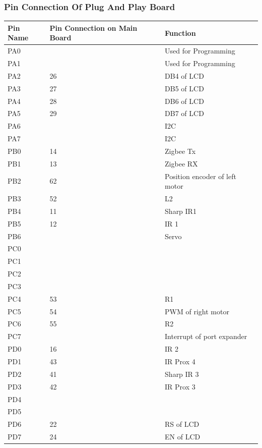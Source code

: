 \documentclass[a4paper,12pt,oneside]{article}
\begin{document}
{\begin{longtable}{|p{}|p{}|p{}|p{}|p{}|}
		\end{longtable}
	\subsubsection{Pin Connection Of Plug And Play Board}
		\begin{longtable}{|p{}|p{}|p{}|}\hline
			Pin Name&	Pin Connection on Main Board&	Function \\ \hline
			PA0&&	Used for Programming\\ \hline
			PA1&&	Used for Programming\\ \hline
			PA2&	26&	DB4 of LCD\\ \hline
			PA3&	27&	DB5 of LCD\\ \hline
			PA4&	28&	DB6 of LCD\\ \hline
			PA5&	29&	DB7 of LCD\\ \hline
			PA6&	&I2C\\ \hline
			PA7&	&I2C\\ \hline
			
			PB0&	14&	Zigbee Tx\\ \hline
			PB1&	13&	Zigbee RX\\ \hline
			PB2&	62&	Position encoder of left motor\\ \hline
			PB3&	52&	L2\\ \hline
			PB4&	11&	Sharp IR1\\ \hline
			PB5&	12&	IR 1\\ \hline
			PB6&	&	Servo\\ \hline
			PC0	&	&\\ \hline
			PC1&	&	\\ \hline
			PC2&	&	\\ \hline
			PC3&	&	\\ \hline
			PC4&	53&	R1\\ \hline
			PC5&	54&	PWM of right motor\\ \hline
			PC6&	55&	R2\\ \hline
			PC7&	&	Interrupt of port expander\\ \hline
			
			PD0	&16	&IR 2\\ \hline
			PD1&	43&	IR Prox 4\\ \hline
			PD2&	41&	Sharp IR 3\\ \hline
			PD3&	42&	IR Prox 3\\ \hline
			PD4&	&	\\ \hline
			PD5&	&	\\ \hline
			PD6&	22&	RS of LCD\\ \hline
			PD7&	24&	EN of LCD\\ \hline
			

\end{longtable}}
\end{document}
